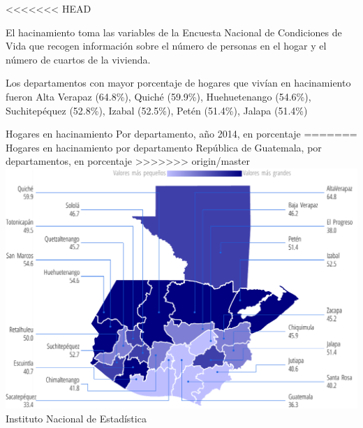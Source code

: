 <<<<<<< HEAD
        {%
        El hacinamiento toma las variables de la Encuesta Nacional de Condiciones de Vida que recogen información sobre el número de personas en el hogar y el número de cuartos de la vivienda.
        
        Los departamentos con mayor porcentaje de hogares que vivían en hacinamiento fueron Alta Verapaz (64.8\%), Quiché (59.9\%), Huehuetenango (54.6\%), Suchitepéquez (52.8\%), Izabal (52.5\%), Petén (51.4\%), Jalapa (51.4\%) }%
        {%
        	Hogares en hacinamiento
        } %
        {%
        	Por departamento, año 2014, en porcentaje} %
=======
        {%
        }%
        {%
        	Hogares en hacinamiento por departamento
        } %
        {%
        	República de Guatemala, por departamentos, en porcentaje} %
>>>>>>> origin/master
        {%
        	\includegraphics[width=52\cuadri]{graficas/1_13.pdf}}%
        {%
        	Instituto Nacional de Estadística} %
        
        
          
          
